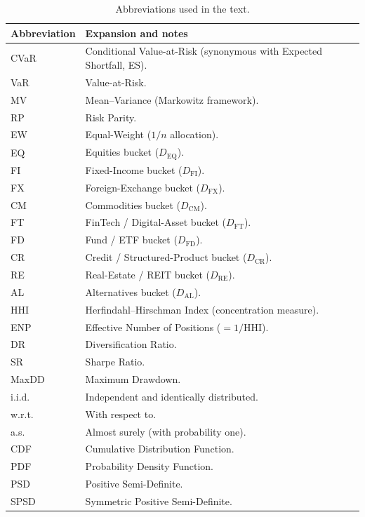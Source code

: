 \documentclass[12pt,openany]{book}
\newcommand{\calD}{\mathcal{D}}
\numberwithin{equation}{chapter}
\theoremstyle{plain}
\theoremstyle{definition}
\theoremstyle{remark}
\renewcommand{\arraystretch}{1.2}
\def\calD{D}%
\def\mathcal#1{#1}%
\begin{document}
\begin{table}[H]
\renewcommand{\arraystretch}{1.35}
\caption{Abbreviations used in the text.}
\label{tab:symbols-abbrev}
\begin{tabularx}{\linewidth}{@{} l X @{}}
\toprule
\textbf{Abbreviation} & \textbf{Expansion and notes} \\
\midrule
CVaR & Conditional Value-at-Risk (synonymous with Expected Shortfall, ES). \\
VaR  & Value-at-Risk. \\
MV   & Mean--Variance (Markowitz framework). \\
RP   & Risk Parity. \\
EW   & Equal-Weight ($1/n$ allocation). \\
EQ   & Equities bucket ($\calD_{\mathrm{EQ}}$). \\
FI   & Fixed-Income bucket ($\calD_{\mathrm{FI}}$). \\
FX   & Foreign-Exchange bucket ($\calD_{\mathrm{FX}}$). \\
CM   & Commodities bucket ($\calD_{\mathrm{CM}}$). \\
FT   & FinTech / Digital-Asset bucket ($\calD_{\mathrm{FT}}$). \\
FD   & Fund / ETF bucket ($\calD_{\mathrm{FD}}$). \\
CR   & Credit / Structured-Product bucket ($\calD_{\mathrm{CR}}$). \\
RE   & Real-Estate / REIT bucket ($\calD_{\mathrm{RE}}$). \\
AL   & Alternatives bucket ($\calD_{\mathrm{AL}}$). \\
HHI  & Herfindahl--Hirschman Index (concentration measure). \\
ENP  & Effective Number of Positions ($=1/\mathrm{HHI}$). \\
DR   & Diversification Ratio. \\
SR   & Sharpe Ratio. \\
MaxDD & Maximum Drawdown. \\
i.i.d.\ & Independent and identically distributed. \\
w.r.t.\ & With respect to. \\
a.s.\ & Almost surely (with probability one). \\
CDF  & Cumulative Distribution Function. \\
PDF  & Probability Density Function. \\
PSD  & Positive Semi-Definite. \\
SPSD & Symmetric Positive Semi-Definite. \\
\bottomrule
\end{tabularx}
\end{table}
\end{document}
